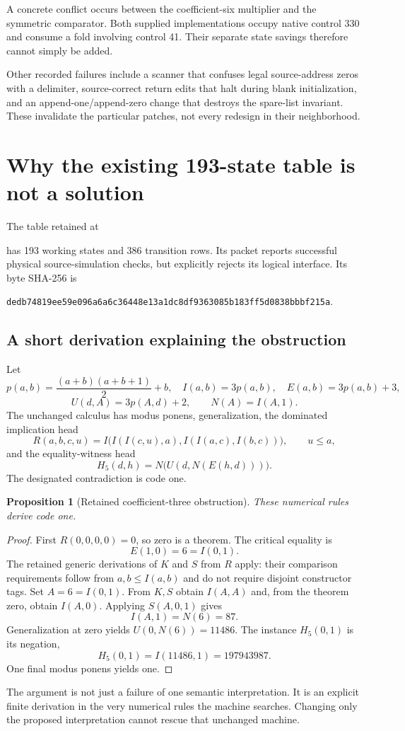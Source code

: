 \documentclass[11pt]{article}
\newtheorem{proposition}{Proposition}
\begin{document}
A concrete conflict occurs between the coefficient-six multiplier and the symmetric comparator. Both supplied implementations occupy native control 330 and consume a fold involving control 41. Their separate state savings therefore cannot simply be added.\cite{h6}

Other recorded failures include a scanner that confuses legal source-address zeros with a delimiter, source-correct return edits that halt during blank initialization, and an append-one/append-zero change that destroys the spare-list invariant. These invalidate the particular patches, not every redesign in their neighborhood.

\section{Why the existing 193-state table is not a solution}
The table retained at
\begin{center}\small
{}
\end{center}
has 193 working states and 386 transition rows. Its packet reports successful physical source-simulation checks, but explicitly rejects its logical interface.\cite{nq} Its byte SHA-256 is
\begin{center}\scriptsize
\nolinkurl{dedb74819ee59e096a6a6c36448e13a1dc8df9363085b183ff5d0838bbbf215a}.
\end{center}

\subsection{A short derivation explaining the obstruction}
Let
\[
 p(a,b)=\frac{(a+b)(a+b+1)}2+b,\quad
 I(a,b)=3p(a,b),\quad E(a,b)=3p(a,b)+3,
\]
\[
 U(d,A)=3p(A,d)+2,\qquad N(A)=I(A,1).
\]
The unchanged calculus has modus ponens, generalization, the dominated implication head
\[
 R(a,b,c,u)=I\bigl(I(I(c,u),a),I(I(a,c),I(b,c))\bigr),\qquad u\le a,
\]
and the equality-witness head
\[
 H_5(d,h)=N\bigl(U(d,N(E(h,d)))\bigr).
\]
The designated contradiction is code one.

\begin{proposition}[Retained coefficient-three obstruction]\label{prop:three}
These numerical rules derive code one.
\end{proposition}
\begin{proof}
First $R(0,0,0,0)=0$, so zero is a theorem. The critical equality is
\[
 E(1,0)=6=I(0,1).
\]
The retained generic derivations of $K$ and $S$ from $R$ apply: their comparison requirements follow from $a,b\le I(a,b)$ and do not require disjoint constructor tags. Set $A=6=I(0,1)$. From $K,S$ obtain $I(A,A)$ and, from the theorem zero, obtain $I(A,0)$. Applying $S(A,0,1)$ gives
\[
 I(A,1)=N(6)=87.
\]
Generalization at zero yields $U(0,N(6))=11486$. The instance $H_5(0,1)$ is its negation,
\[
 H_5(0,1)=I(11486,1)=197943987.
\]
One final modus ponens yields one.
\end{proof}
The argument is not just a failure of one semantic interpretation. It is an explicit finite derivation in the very numerical rules the machine searches. Changing only the proposed interpretation cannot rescue that unchanged machine.
\end{document}
